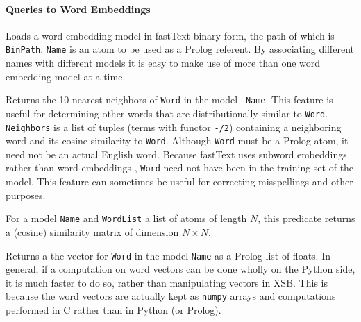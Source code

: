 \paragraph{Queries to Word Embeddings}
\begin{description}
  Loads a word embedding model in fastText binary form, the path of
  which is {\tt BinPath}.  {\tt Name} is an atom to be used as a
  Prolog referent.  By associating different names with different
  models it is easy to make use of more than one word embedding model
  at a time.

  Returns the 10 nearest neighbors of {\tt Word} in the model {\tt
    Name}.  This feature is useful for determining other words that
  are distributionally similar to {\tt Word}.  {\tt Neighbors} is a
  list of tuples (terms with functor {\tt -/2}) containing a
  neighboring word and its cosine similarity to {\tt Word}.   Although
  {\tt Word} must be a Prolog atom, it need not be an actual English
  word.  Because fastText uses subword embeddings rather than word
  embeddings \cite{BGJM17}, {\tt Word} need not have been in the
  training set of the model.  This feature can sometimes be useful for
  correcting misspellings and other purposes.

  For a model {\tt Name} and {\tt WordList} a list of atoms of length
  $N$, this predicate returns a (cosine) similarity matrix of
  dimension $N \times N$.
    
  Returns a the vector for {\tt Word} in the model {\tt Name} as a
  Prolog list of floats.  In general, if a computation on word vectors
  can be done wholly on the Python side, it is much faster to do so,
  rather than manipulating vectors in XSB.  This is because the word
  vectors are actually kept as {\tt numpy} arrays and computations
  performed in C rather than in Python (or Prolog).
\end{description}

